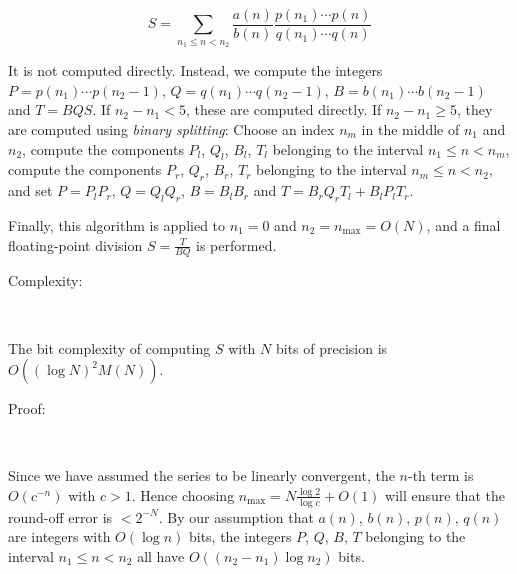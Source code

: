 \[
S=\sum _{n_{1}\leq n<n_{2}}
\frac{a(n)}{b(n)}\frac{p(n_{1})\cdots p(n)}{q(n_{1})\cdots q(n)}\]

It is not computed directly. Instead, we compute the integers
\( P={p(n_{1})}\cdots {p(n_{2}-1)} \),  \( Q={q(n_{1})}\cdots {q(n_{2}-1)} \),
\( B={b(n_{1})}\cdots {b(n_{2}-1)} \) and  \( T=BQS \). If  \( n_{2}-n_{1}<5 \),
these are computed directly.  If  \( n_{2}-n_{1}\geq 5 \), they are computed
using {\em binary splitting}: Choose an index  \( n_{m} \) in the middle of
\( n_{1} \) and \( n_{2} \), compute the components \( P_{l} \), \( Q_{l} \),
\( B_{l} \), \( T_{l} \) belonging to the interval \( n_{1}\leq n<n_{m} \),
compute the components  \( P_{r} \),  \( Q_{r} \),  \( B_{r} \),  \( T_{r} \)
belonging to the interval  \( n_{m}\leq n<n_{2} \), and set 
\( P=P_{l}P_{r} \),  \( Q=Q_{l}Q_{r} \),  \( B=B_{l}B_{r} \) and
\( T=B_{r}Q_{r}T_{l}+B_{l}P_{l}T_{r} \).

Finally, this algorithm is applied to  \( n_{1}=0 \) and
\( n_{2}=n_{\max }=O(N) \), and a final floating-point division
\( S=\frac{T}{BQ} \) is performed.

\begin{description}
\item [Complexity:]~
\end{description}

The bit complexity of computing  \( S \) with  \( N \) bits of precision is 
\( O((\log N)^{2}M(N)) \).

\begin{description}
\item [Proof:]~
\end{description}

Since we have assumed the series to be linearly convergent, the  \( n \)-th
term is  \( O(c^{-n}) \) with  \( c>1 \). Hence choosing
\( n_{\max }=N\frac{\log 2}{\log c}+O(1) \) will ensure that the round-off
error is  \( <2^{-N} \). By our assumption that  \( a(n) \),  \( b(n) \),
\( p(n) \),  \( q(n) \) are integers with  \( O(\log n) \) bits, the integers
\( P \),  \( Q \),  \( B \),  \( T \) belonging to the interval
\( n_{1}\leq n<n_{2} \) all have \( O((n_{2}-n_{1})\log n_{2}) \) bits.

